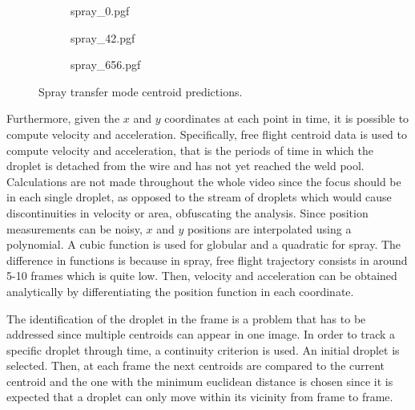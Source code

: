 \begin{figure}
\centering
  \begin{subfigure}[b]{.95\textwidth}
    {spray_0.pgf}
    \caption{}

  \end{subfigure}
\vfill
  \begin{subfigure}[b]{.95\textwidth}
    {spray_42.pgf}
    \caption{}
  \end{subfigure}
  \vfill
 \begin{subfigure}[b]{.95\textwidth}
    {spray_656.pgf}
    \caption{}
  \end{subfigure}
    \caption[Spray transfer mode centroid predictions]{Spray transfer mode centroid predictions.}
    \label{fig:spray_centroids}
\end{figure}


Furthermore, given the $x$ and $y$ coordinates at each point in time, it is possible to compute velocity and acceleration. Specifically, free flight centroid data is used to compute velocity and acceleration, that is the periods of time in which the droplet is detached from the wire and has not yet reached the weld pool. Calculations are not made throughout the whole video since the focus should be in each single droplet, as opposed to the stream of droplets which would cause discontinuities in velocity or area, obfuscating the analysis. Since position measurements can be noisy, $x$ and $y$ positions are interpolated using a polynomial. A cubic function is used for globular and a quadratic for spray. The difference in functions is because in spray, free flight trajectory consists in around 5-10 frames which is quite low. Then, velocity and acceleration can be obtained analytically by differentiating the position function in each coordinate.

The identification of the droplet in the frame is a problem that has to be addressed since multiple centroids can appear in one image. In order to track a specific droplet through time, a continuity criterion is used. An initial droplet is selected. Then, at each frame the next centroids are compared to the current centroid and the one with the minimum euclidean distance is chosen since it is expected that a droplet can only move within its vicinity from frame to frame.

